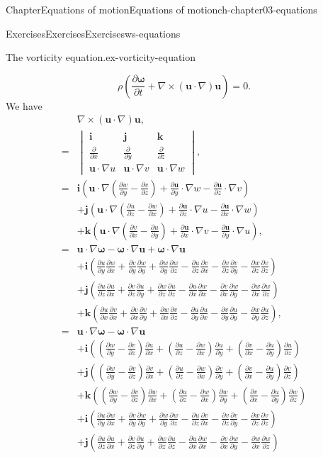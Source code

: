\documentclass[oneside,10pt,]{book}
\numberwithin{equation}{section}
\newcommand{\pd}[2]{\frac{\partial#1}{\partial#2}}
\newcommand{\bu}{\boldsymbol{u}}
\newcommand{\bomega}{\boldsymbol{\omega}}
\newcommand{\bi}{\boldsymbol{i}}
\newcommand{\bj}{\boldsymbol{j}}
\newcommand{\bk}{\boldsymbol{k}}
\begin{document}
\begin{chapterptx}{Chapter}{Equations of motion}{}{Equations of motion}{}{}{ch-chapter03-equations}
\begin{exercises-section}{Exercises}{Exercises}{}{Exercises}{}{}{ws-equations}
\begin{divisionexercise}{7}{The vorticity equation.}{}{ex-vorticity-equation}
\begin{enumerate}[font=\bfseries,label=(\alph*),ref=\alph*]
\begin{equation*}
\rho\left(\pd{\bomega}{t} + \nabla \times(\bu \cdot \nabla)\bu\right) = 0.
\end{equation*}
We have%
\begin{align*}
& \nabla \times(\bu \cdot \nabla)\bu,\\
=&\begin{vmatrix}
\bi & \bj & \bk \\
\pd{}{x} & \pd{}{y} & \pd{}{z} \\
\bu \cdot \nabla u & \bu \cdot \nabla v & \bu \cdot \nabla w
\end{vmatrix},\\
=&\bi\left(\bu\cdot\nabla\left(\pd{w}{y}-\pd{v}{z}\right)+\pd{\bu}{y}\cdot\nabla w-\pd{\bu}{z}\cdot\nabla v\right)\\
&+\bj\left(\bu\cdot\nabla\left(\pd{u}{z}-\pd{w}{x}\right)+\pd{\bu}{z}\cdot\nabla u-\pd{\bu}{x}\cdot\nabla w\right)\\
&+\bk\left(\bu\cdot\nabla\left(\pd{v}{x}-\pd{u}{y}\right)+\pd{\bu}{x}\cdot\nabla v-\pd{\bu}{y}\cdot\nabla u\right),\\
=&\bu\cdot\nabla\bomega-\bomega\cdot\nabla\bu+\bomega\cdot\nabla\bu\\
&+\bi\left(\pd{u}{y}\pd{w}{x}+\pd{v}{y}\pd{w}{y}+\pd{w}{y}\pd{w}{z}-\pd{u}{z}\pd{v}{x}-\pd{v}{z}\pd{v}{y}-\pd{w}{z}\pd{v}{z}\right)\\
&+\bj\left(\pd{u}{z}\pd{u}{x}+\pd{v}{z}\pd{u}{y}+\pd{w}{z}\pd{u}{z}-\pd{u}{x}\pd{w}{x}-\pd{v}{x}\pd{w}{y}-\pd{w}{x}\pd{w}{z}\right)\\
&+\bk\left(\pd{u}{x}\pd{v}{x}+\pd{v}{x}\pd{v}{y}+\pd{w}{x}\pd{v}{z}-\pd{u}{y}\pd{u}{x}-\pd{v}{y}\pd{u}{y}-\pd{w}{y}\pd{u}{z}\right),\\
=&\bu\cdot\nabla\bomega-\bomega\cdot\nabla\bu\\
&+\bi\left(\left(\pd{w}{y}-\pd{v}{z}\right)\pd{u}{x}+\left(\pd{u}{z}-\pd{w}{x}\right)\pd{u}{y}+\left(\pd{v}{x}-\pd{u}{y}\right)\pd{u}{z}\right)\\
&+\bj\left(\left(\pd{w}{y}-\pd{v}{z}\right)\pd{v}{x}+\left(\pd{u}{z}-\pd{w}{x}\right)\pd{v}{y}+\left(\pd{v}{x}-\pd{u}{y}\right)\pd{v}{z}\right)\\
&+\bk\left(\left(\pd{w}{y}-\pd{v}{z}\right)\pd{w}{x}+\left(\pd{u}{z}-\pd{w}{x}\right)\pd{w}{y}+\left(\pd{v}{x}-\pd{u}{y}\right)\pd{w}{z}\right)\\
&+\bi\left(\pd{u}{y}\pd{w}{x}+\pd{v}{y}\pd{w}{y}+\pd{w}{y}\pd{w}{z}-\pd{u}{z}\pd{v}{x}-\pd{v}{z}\pd{v}{y}-\pd{w}{z}\pd{v}{z}\right)\\
&+\bj\left(\pd{u}{z}\pd{u}{x}+\pd{v}{z}\pd{u}{y}+\pd{w}{z}\pd{u}{z}-\pd{u}{x}\pd{w}{x}-\pd{v}{x}\pd{w}{y}-\pd{w}{x}\pd{w}{z}\right)\\

\end{align*}
\end{enumerate}
\end{divisionexercise}
\end{exercises-section}
\end{chapterptx}
\end{document}
